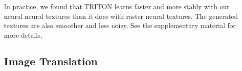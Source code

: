 \documentclass{article}
\begin{document}
		
		In practice, we found that TRITON learns faster and more stably with our neural neural textures than it does with raster neural textures. The generated textures are also smoother and less noisy. See the supplementary material for more details.




\vspace{-3pt}
	\subsection{Image Translation}
	\label{sec:image_translation}
\vspace{-3pt}


\end{document}
